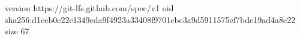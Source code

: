 version https://git-lfs.github.com/spec/v1
oid sha256:d1eeb0e22e1349eda9f4923a33408f9701cbc3a9d5911575ef7bde19ad4a8e22
size 67
